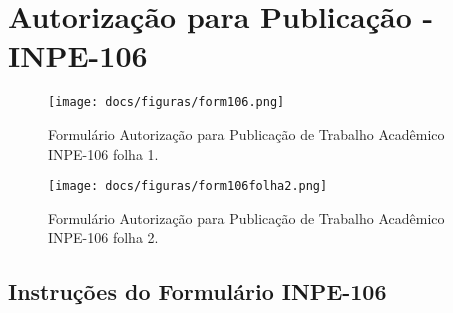 \section{Autorização para Publicação - INPE-106}
\begin{figure}[!ht]
	\caption{Formulário Autorização para Publicação de Trabalho Acadêmico INPE-106 folha 1.} 
	\vspace{6mm}	%
	\centering
	\texttt{[image: docs/figuras/form106.png]}
	\label{form106}
\end{figure}

\begin{figure}[!ht]
	\caption{Formulário Autorização para Publicação de Trabalho Acadêmico INPE-106 folha 2.} 
	\vspace{6mm}	%
	\centering
	\texttt{[image: docs/figuras/form106folha2.png]}
	\label{form106a}
\end{figure}

\clearpage
\subsection{Instruções do Formulário INPE-106} 
\label{instr106}


